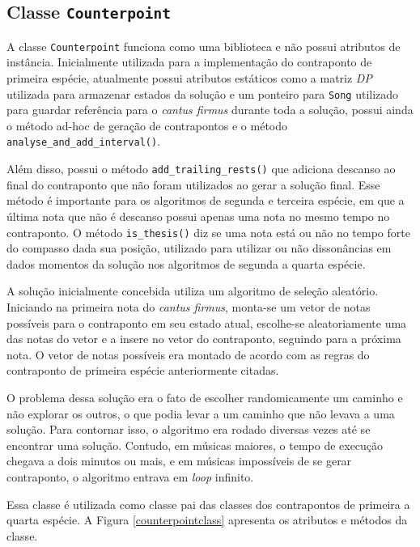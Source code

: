     \subsection[Classe \texttt{Counterpoint}]{Classe \texttt{Counterpoint}}

    A classe \texttt{Counterpoint} funciona como uma biblioteca e não possui atributos de instância. Inicialmente utilizada para a implementação do contraponto de primeira espécie, atualmente possui atributos estáticos como a matriz \textit{DP} utilizada para armazenar estados da solução e um ponteiro para \texttt{Song} utilizado para guardar referência para o \textit{cantus firmus} durante toda a solução, possui ainda o método ad-hoc de geração de contrapontos e o método \texttt{analyse\_and\_add\_interval()}.

    Além disso, possui o método \texttt{add\_trailing\_rests()} que adiciona descanso ao final do contraponto que não foram utilizados ao gerar a solução final. Esse método é importante para os algoritmos de segunda e terceira espécie, em que a última nota que não é descanso possui apenas uma nota no mesmo tempo no contraponto. O método \texttt{is\_thesis()} diz se uma nota está ou não no tempo forte do compasso dada sua posição, utilizado para utilizar ou não dissonâncias em dados momentos da solução nos algoritmos de segunda a quarta espécie.

    A solução inicialmente concebida utiliza um algoritmo de seleção aleatório. Iniciando na primeira nota do \textit{cantus firmus}, monta-se um vetor de notas possíveis para o contraponto em seu estado atual, escolhe-se aleatoriamente uma das notas do vetor e a insere no vetor do contraponto, seguindo para a próxima nota. O vetor de notas possíveis era montado de acordo com as regras do contraponto de primeira espécie anteriormente citadas.

    O problema dessa solução era o fato de escolher randomicamente um caminho e não explorar os outros, o que podia levar a um caminho que não levava a uma solução. Para contornar isso, o algoritmo era rodado diversas vezes até se encontrar uma solução. Contudo, em músicas maiores, o tempo de execução chegava a dois minutos ou mais, e em músicas impossíveis de se gerar contraponto, o algoritmo entrava em \textit{loop} infinito.

    Essa classe é utilizada como classe pai das classes dos contrapontos de primeira a quarta espécie. A Figura \ref{counterpointclass} apresenta os atributos e métodos da classe.

